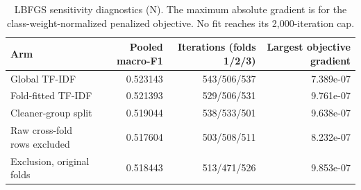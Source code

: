 \begin{table}[t]
\small\centering
\caption{LBFGS sensitivity diagnostics (N). The maximum absolute gradient is for the class-weight-normalized penalized objective. No fit reaches its 2,000-iteration cap.}
\begin{tabular}{lrrr}
\toprule
Arm & Pooled macro-F1 & Iterations (folds 1/2/3) & Largest objective gradient \\
\midrule
Global TF-IDF & 0.523143 & 543/506/537 & 7.389e-07 \\
Fold-fitted TF-IDF & 0.521393 & 529/506/531 & 9.761e-07 \\
Cleaner-group split & 0.519044 & 538/533/501 & 9.638e-07 \\
Raw cross-fold rows excluded & 0.517604 & 503/508/511 & 8.232e-07 \\
Exclusion, original folds & 0.518443 & 513/471/526 & 9.853e-07 \\
\bottomrule
\end{tabular}
\end{table}
